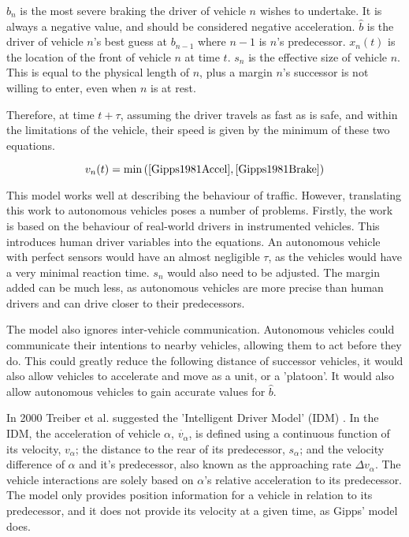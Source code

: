 $b_n$ is the most severe braking the driver of vehicle $n$ wishes to undertake. It is always a negative value, and should be considered negative acceleration. $\hat{b}$ is the driver of vehicle $n$'s best guess at $b_{n-1}$ where $n-1$ is $n$'s predecessor. $x_n(t)$ is the location of the front of vehicle $n$ at time $t$. $s_n$ is the effective size of vehicle $n$. This is equal to the physical length of $n$, plus a margin $n$'s successor is not willing to enter, even when $n$ is at rest.

Therefore, at time $t + \tau$, assuming the driver travels as fast as is safe, and within the limitations of the vehicle, their speed is given by the minimum of these two equations.

\begin{equation}
v_n(t) = \min{(\eqref{Gipps1981Accel},\eqref{Gipps1981Brake})}
\end{equation}

This model works well at describing the behaviour of traffic. However, translating this work to autonomous vehicles poses a number of problems. Firstly, the work is based on the behaviour of real-world drivers in instrumented vehicles. This introduces human driver variables into the equations. An autonomous vehicle with perfect sensors would have an almost negligible $\tau$, as the vehicles would have a very minimal reaction time. $s_n$ would also need to be adjusted. The margin added can be much less, as autonomous vehicles are more precise than human drivers and can drive closer to their predecessors. 

The model also ignores inter-vehicle communication. Autonomous vehicles could communicate their intentions to nearby vehicles, allowing them to act before they do. This could greatly reduce the following distance of successor vehicles, it would also allow vehicles to accelerate and move as a unit, or a 'platoon'. It would also allow autonomous vehicles to gain accurate values for $\hat{b}$.

In 2000 Treiber et al. suggested the 'Intelligent Driver Model' (IDM) \citep{Treiber2000}. In the IDM, the acceleration of vehicle $\alpha$, $\dot{v_\alpha}$, is defined using a continuous function of its velocity, $v_\alpha$; the distance to the rear of its predecessor, $s_\alpha$; and the velocity difference of $\alpha$ and it's predecessor, also known as the approaching rate $\Delta v_\alpha$. The vehicle interactions are solely based on $\alpha$'s relative acceleration to its predecessor. The model only provides position information for a vehicle in relation to its predecessor, and it does not provide its velocity at a given time, as Gipps' model does. 

